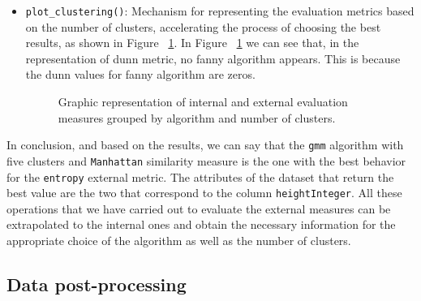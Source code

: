 \begin{itemize}
\item \texttt{plot\_clustering()}: Mechanism for representing the evaluation metrics based on the number of clusters, accelerating the process of choosing the best results, as shown in Figure ~\ref{fig:clustering}. In Figure ~\ref{fig:clustering} we can see that, in the representation of dunn metric, no fanny algorithm appears. This is because the dunn values for fanny algorithm are zeros.

\begin{figure}[htbp]
  \centering
    \qquad
    \caption{Graphic representation of internal and external evaluation measures grouped by algorithm and number of clusters.}%
    \label{fig:clustering}%
\end{figure}

\end{itemize}
In conclusion, and based on the results, we can say that the \texttt{gmm} algorithm with five clusters and \texttt{Manhattan} similarity measure is the one with the best behavior for the \texttt{entropy} external metric. The attributes of the dataset that return the best value are the two that correspond to the column \texttt{heightInteger}.
All these operations that we have carried out to evaluate the external measures can be extrapolated to the internal ones and obtain the necessary information for the appropriate choice of the algorithm as well as the number of clusters.\\

\subsection {Data post-processing}

